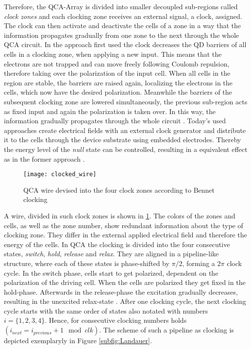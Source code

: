 Therefore, the QCA-Array is divided into smaller decoupled sub-regions called \textit{clock zones} and each clocking zone receives an external signal, a clock, assigned. The clock can then activate and deactivate the cells of a zone in a way that the information propagates gradually from one zone to the next through the whole QCA circuit. In the approach first used the clock decreases the QD barriers of all cells in a clocking zone, when applying a new input. This means that the electrons are not trapped and can move freely following Coulomb repulsion, therefore taking over the polarization of the input cell. When all cells in the region are stable, the barriers are raised again, localizing the electrons in the cells, which now have the desired polarization. Meanwhile the barriers of the subsequent clocking zone are lowered simultaneously, the previous sub-region acts as fixed input and again the polarization is taken over. In this way, the information gradually propagates through the whole circuit \cite{lent1997device}. Today's used approaches create electrical fields with an external clock generator and distribute it to the cells through the device substrate using embedded electrodes. Thereby the energy level of the \textit{null} state can be controlled, resulting in a equivalent effect as in the former approach \cite{Walter}.\\
\begin{figure}
	\centering
	\texttt{[image: clocked\_wire]}
	\caption{QCA wire devised into the four clock zones according to Bennet clocking}\label{fig:QCA_wire_clocked}
\end{figure}
A wire, divided in such clock zones is shown in \ref{fig:QCA_wire_clocked}. The colors of the zones and cells, as well as the zone number, show redundant information about the type of clocking zone. They differ in the external applied electrical field and therefore the energy of the cells. In QCA the clocking is divided into the four consecutive states, \textit{switch}, \textit{hold}, \textit{release} and \textit{relax}. They are aligned in a pipeline-like structure, where each of these states is phase-shifted by $\pi/2$, forming a $2\pi$ clock cycle. In the switch phase, cells start to get polarized, dependent on the polarization of the driving cell. When the cells are polarized they get fixed in the hold-phase. Afterwards in the release-phase the excitation gradually decreases, resulting in the unexcited relax-state \cite{Sasamal2020QuantumDotCA}. After one clocking cycle, the next clocking cycle starts with the same order of states also notated with numbers $i = \{1, 2, 3, 4\}$. Hence, for consecutive clocking numbers holds $(i_{next} = i_{previous}+1 \mod clk)$. The scheme of such a pipeline as clocking is depicted exemplaryly in Figure \ref{subfig:Landauer}.

